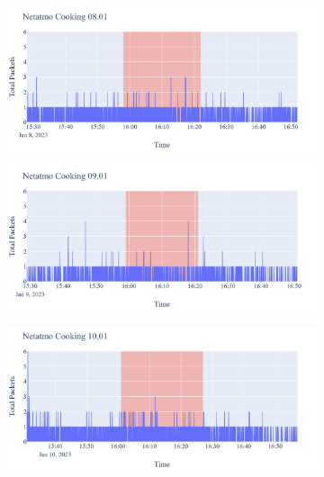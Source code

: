 \begin{figure}[H]
    \begin{subfigure}[b]{0.5\textwidth}
        \centering
        \includegraphics[width=1.2\hsize]{figures/Netatmo_Cooking_Packets_08.01.png}
    \end{subfigure}
    \begin{subfigure}[b]{0.5\textwidth}
        \centering
        \includegraphics[width=1.2\hsize]{figures/Netatmo_Cooking_Packets_09.01.png}
    \end{subfigure}
    \begin{subfigure}[b]{0.5\textwidth}
        \centering
        \includegraphics[width=1.2\hsize]{figures/Netatmo_Cooking_Packets_10.01.png}
    \end{subfigure}

\end{figure}

